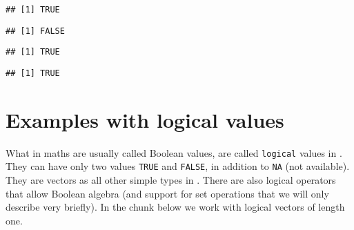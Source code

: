 \documentclass[paper=a4,10pt,div=17,headsepline,BCOR=12mm,twoside,open=right]{scrbook}\usepackage{knitr}
\begin{document}
\begin{knitrout}\footnotesize
{}\color{fgcolor}\begin{kframe}
\begin{alltt}
\hlstd{(}\hlstd{)}
\end{alltt}
\begin{verbatim}
## [1] TRUE
\end{verbatim}
\begin{alltt}
\hlstd{(}\hlstd{)}
\end{alltt}
\begin{verbatim}
## [1] FALSE
\end{verbatim}
\begin{alltt}
\hlstd{(} \hlopt{/} \hlstd{)}
\end{alltt}
\begin{verbatim}
## [1] TRUE
\end{verbatim}
\begin{alltt}
\hlstd{(} \hlopt{/} \hlstd{)}
\end{alltt}
\begin{verbatim}
## [1] TRUE
\end{verbatim}
\end{kframe}
\end{knitrout}

\section{Examples with logical values}

What in maths are usually called Boolean values, are called \texttt{logical} values in \R. They can have only two values \texttt{TRUE} and \texttt{FALSE}, in addition to \texttt{NA} (not available). They are vectors as all other simple types in \R. There are also logical operators that allow Boolean algebra (and support for set operations that we will only describe very briefly). In the chunk below we work with logical vectors of length one.
\end{document}
